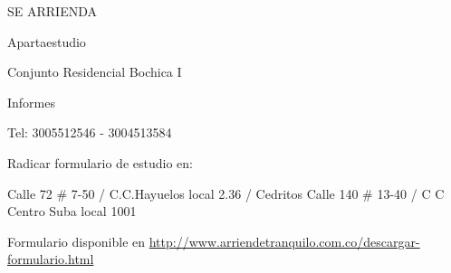 \documentclass[final]{beamer}
\date{Jul. 31th, 2007}
\begin{document}
  \begin{frame}{}
\centering
  \begin{block}
  \centering
      {\VERYHuge \begin{center}
      SE ARRIENDA
      \end{center}}\par
      {\Large \begin{center}
      Apartaestudio
      \end{center}}\par
      {\large \begin{center}
      Conjunto Residencial Bochica I
      \end{center}}\par
      {\large \begin{center}
      Informes
      \end{center}}\par
      {\Large \begin{center}
      Tel: 3005512546 - 3004513584 \end{center}}\par
      {\normalsize \begin{center}
      Radicar formulario de estudio en:
      \end{center}Calle 72 \# 7-50 / C.C.Hayuelos local 2.36  /  Cedritos Calle 140 \# 13-40 / C C Centro Suba   local 1001}\par
      {\normalsize Formulario disponible en \url{http://www.arriendetranquilo.com.co/descargar-formulario.html}}\par
  \end{block}
  \end{frame}
\end{document}

